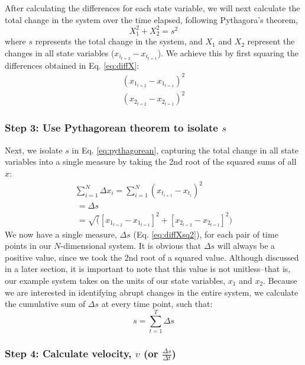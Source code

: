\documentclass[12pt,twoside,openany]{reedthesis}
\begin{document}
After calculating the differences for each state variable, we will next calculate the total change in the system over the time elapsed, following Pythagora's theorem,
\begin{equation}
 X_1^2 + X_2^2 = s^2 
  \label{eq:pythagorean}
\end{equation}
where \(s\) represents the total change in the system, and \(X_1\) and \(X_2\) represent the changes in all state variables (\(x_{i_{t=2}} - x_{i_{t=1}}\)). We achieve this by first squaring the differences obtained in Eq. \eqref{eq:diffX}:
\begin{equation}
\begin{array}{rcr}
(x_{1_{t=2}} - x_{1_{t=1}})^2  \\
(x_{2_{t=2}} - x_{2_{t=1}})^2 
\end{array}
  \label{eq:diffXsq}
\end{equation}
\hypertarget{step-3-use-pythagorean-theorem-to-isolate-s}{%
\subsubsection{\texorpdfstring{Step 3: Use Pythagorean theorem to isolate \(s\)}{Step 3: Use Pythagorean theorem to isolate s}}\label{step-3-use-pythagorean-theorem-to-isolate-s}}

Next, we isolate \(s\) in Eq. \eqref{eq:pythagorean}, capturing the total change in all state variables into a single measure by taking the 2nd root of the squared sums of all \(x\):
\begin{equation}
\begin{array}{rcr}
\sum_{i=1}^{N} \Delta {x_i} = \sum_{i=1}^{N}(x_{t_{i+1}} - x_{t_i})^2 \\ 
\ = \Delta s \\ 
\ = \sqrt([x_{1_{t=2}} - x_{1_{t=1}}]^2 + [x_{2_{t=2}} - x_{2_{t=1}}]^2)
\end{array}
\label{eq:diffXsq2}
\end{equation}
We now have a single measure, \(\Delta s\) (Eq. \eqref{eq:diffXsq2}), for each pair of time points in our \(N\)-dimensional system. It is obvious that \(\Delta s\) will always be a positive value, since we took the 2nd root of a squared value. Although discussed in a later section, it is important to note that this value is not unitless--that is, our example system takes on the units of our state variables, \(x_1\) and \(x_2\). Because we are interested in identifying abrupt changes in the entire system, we calculate the cumulative sum of \(\Delta s\) at every time point, such that:
\begin{equation}
s = \sum_{t=1}^T \Delta s
\label{eq:s}
\end{equation}
\hypertarget{step-4-calculate-velocity-v-or-frac-delta-sdelta-t}{%
\subsubsection{\texorpdfstring{Step 4: Calculate velocity, \(v\) (or \(\frac {\Delta s}{\Delta t}\))}{Step 4: Calculate velocity, v (or \textbackslash frac \{\textbackslash Delta s\}\{\textbackslash Delta t\})}}\label{step-4-calculate-velocity-v-or-frac-delta-sdelta-t}}
\end{document}
